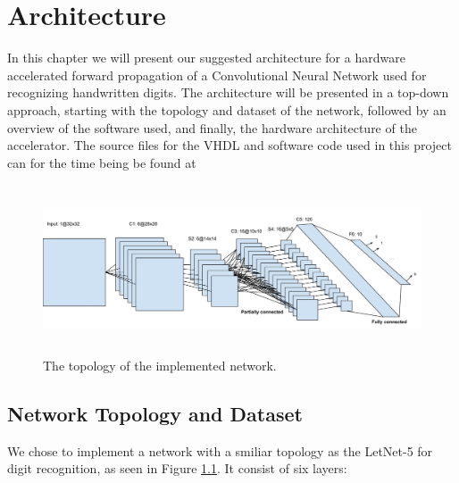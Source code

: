 \chapter{Architecture} \label{chap_method}

In this chapter we will present our suggested architecture for a hardware accelerated forward propagation of a Convolutional Neural Network used for recognizing handwritten digits. The architecture will be presented in a top-down approach, starting with the topology and dataset of the network, followed by an overview of the software used, and finally, the hardware architecture of the accelerator. The source files for the VHDL and software code used in this project can for the time being be found at \cite{Halvorsen2015}

\begin{figure}[h!]
  \centering
      \includegraphics[width=1.2\textwidth, height=5cm]{Figures/Method/Network_topology}
    \caption[The topology of the implemented network.]{The topology of the implemented network.}
    \label{fig_network_topology}
\end{figure}

\section{Network Topology and Dataset}

We chose to implement a network with a smiliar topology as the LetNet-5 for digit recognition, as seen in Figure \ref{fig_network_topology}. It consist of six layers: 

